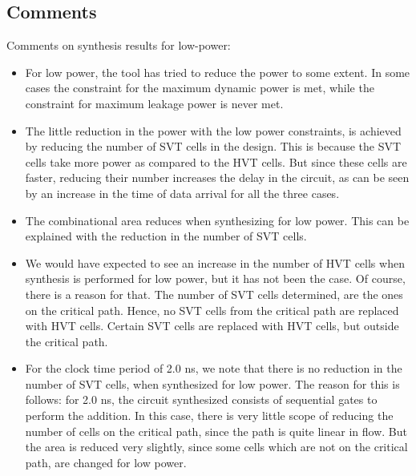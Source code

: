 \documentclass[11pt,a4paper]{article}
\begin{document}
\subsection{Comments}
Comments on synthesis results for low-power:
\begin{itemize}
\item For low power, the tool has tried to reduce the power to some extent. In some cases the constraint for the maximum dynamic power is met, while the constraint for maximum leakage power is never met.
\item The little reduction in the power with the low power constraints, is achieved by reducing the number of SVT cells in the design. This is because the SVT cells take more power as compared to the HVT cells. But since these cells are faster, reducing their number increases the delay in the circuit, as can be seen by an increase in the time of data arrival for all the three cases.
\item The combinational area reduces when synthesizing for low power. This can be explained with the reduction in the number of SVT cells.
\item We would have expected to see an increase in the number of HVT cells when synthesis is performed for low power, but it has not been the case. Of course, there is a reason for that. The number of SVT cells determined, are the ones on the critical path. Hence, no SVT cells from the critical path are replaced with HVT cells. Certain SVT cells are replaced with HVT cells, but outside the critical path.
\item For the clock time period of 2.0 ns, we note that there is no reduction in the number of SVT cells, when synthesized for low power. The reason for this is follows: for 2.0 ns, the circuit synthesized consists of sequential gates to perform the addition. In this case, there is very little scope of reducing the number of cells on the critical path, since the path is quite linear in flow. But the area is reduced very slightly, since some cells which are not on the critical path, are changed for low power.
\end{itemize}
\end{document}
